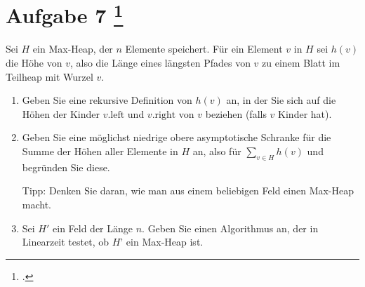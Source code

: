\documentclass{lehramt-informatik-aufgabe}
\begin{document}
\section{Aufgabe 7
\footcite{46115:2020:03}}

Sei $H$ ein Max-Heap, der $n$ Elemente speichert. Für ein Element $v$ in
$H$ sei $h(v)$ die Höhe von $v$, also die Länge eines längsten Pfades
von $v$ zu einem Blatt im Teilheap mit Wurzel $v$.

\begin{enumerate}


\item Geben Sie eine rekursive Definition von $h(v)$ an, in der Sie sich
auf die Höhen der Kinder $v.\text{left}$ und $v.\text{right}$ von $v$
beziehen (falls $v$ Kinder hat).



\item Geben Sie eine möglichst niedrige obere asymptotische Schranke für
die Summe der Höhen aller Elemente in $H$ an, also für $\sum_{v \in H}
h(v)$ und begründen Sie diese.

Tipp: Denken Sie daran, wie man aus einem beliebigen Feld einen Max-Heap
macht.


\item Sei $H'$ ein Feld der Länge $n$. Geben Sie einen Algorithmus an,
der in Linearzeit testet, ob $H’$ ein Max-Heap ist.
\end{enumerate}
\end{document}
